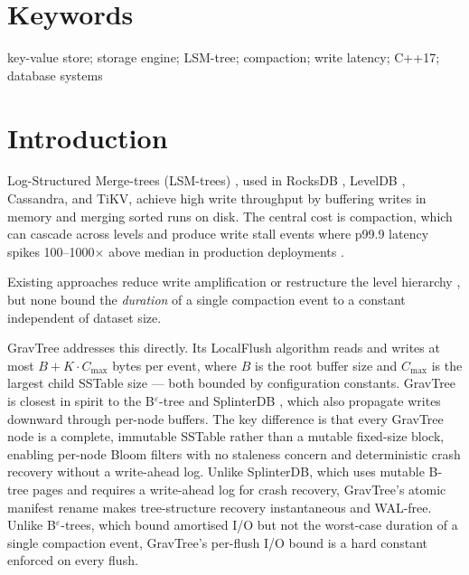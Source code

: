 \documentclass{jors}
\begin{document}
\section*{Keywords}

key-value store; storage engine; LSM-tree; compaction; write latency; C++17; database systems

\section*{Introduction}

Log-Structured Merge-trees (LSM-trees) \citep{oneil1996lsm}, used in
RocksDB \citep{rocksdb}, LevelDB \citep{leveldb}, Cassandra, and TiKV,
achieve high write throughput by buffering writes in memory and merging
sorted runs on disk. The central cost is compaction, which can cascade
across levels and produce write stall events where p99.9 latency spikes
100--1000$\times$ above median in production deployments
\citep{lsm-survey}.

Existing approaches reduce write amplification
\citep{wisckey,pebblesdb,dostoevsky} or restructure the level hierarchy
\citep{pebblesdb}, but none bound the \emph{duration} of a single
compaction event to a constant independent of dataset size.

GravTree addresses this directly. Its LocalFlush algorithm reads and
writes at most $B + K \cdot C_{\max}$ bytes per event, where $B$ is the
root buffer size and $C_{\max}$ is the largest child SSTable size — both
bounded by configuration constants. GravTree is closest in spirit to the
B$^\varepsilon$-tree \citep{bender2007cache} and SplinterDB
\citep{splinterdb}, which also propagate writes downward through per-node
buffers. The key difference is that every GravTree node is a complete,
immutable SSTable rather than a mutable fixed-size block, enabling per-node
Bloom filters with no staleness concern and deterministic crash recovery
without a write-ahead log. Unlike SplinterDB, which uses mutable B-tree
pages and requires a write-ahead log for crash recovery, GravTree's
atomic manifest rename makes tree-structure recovery instantaneous and
WAL-free. Unlike B$^\varepsilon$-trees, which bound amortised I/O but
not the worst-case duration of a single compaction event, GravTree's
per-flush I/O bound is a hard constant enforced on every flush.
\end{document}

